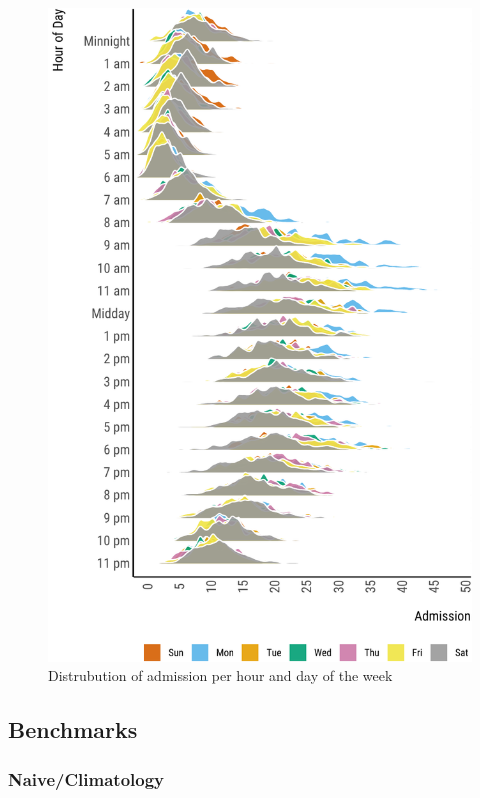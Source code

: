 \documentclass[]{elsarticle} %
\begin{document}
\begin{figure}[H]

{\centering \includegraphics{paper_files/figure-latex/hourly-plot-ridge-1} 

}

\caption{Distrubution of admission per hour and day of the week}\label{fig:hourly-plot-ridge}
\end{figure}

\hypertarget{benchmarks}{%
\subsection{Benchmarks}\label{benchmarks}}

\hypertarget{naiveclimatology}{%
\subsubsection{Naive/Climatology}\label{naiveclimatology}}
\end{document}
